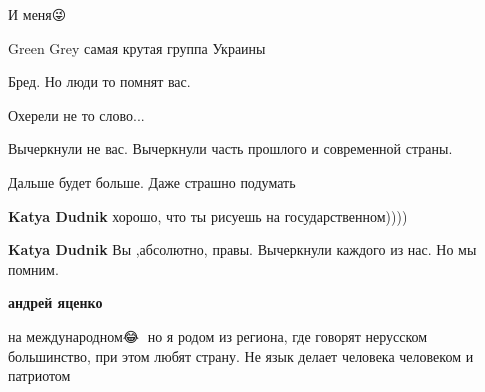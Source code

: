 \begin{itemize}
И меня😜

 
Green Grey самая крутая группа Украины 🤟🤟

 

Бред. Но люди то помнят вас.

Охерели не то слово...

Вычеркнули не вас. Вычеркнули часть прошлого и современной страны.

Дальше будет больше. Даже страшно подумать

\begin{itemize}
 
\textbf{Katya Dudnik} хорошо, что ты рисуешь на государственном))))

 
\textbf{Katya Dudnik} Вы ,абсолютно, правы. Вычеркнули каждого из нас. Но мы помним.

 
\textbf{андрей яценко} 

на международном😂🙈 но я родом из региона, где говорят нерусском большинство,
при этом любят страну. Не язык делает человека человеком и патриотом
\end{itemize}

 

\end{itemize}
